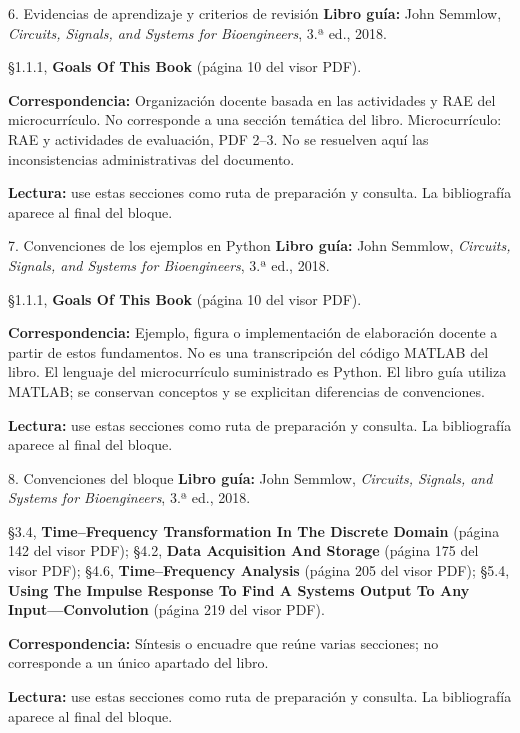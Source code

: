 \documentclass[
  10pt,
  ignorenonframetext,
  aspectratio=169,
  spanish,
]{beamer}
\begin{document}
\begin{frame}{6. Evidencias de aprendizaje y criterios de revisión}
\label{evidencias-de-aprendizaje-y-criterios-de-revisiuxf3n-1}
\textbf{Libro guía:} John Semmlow, \emph{Circuits, Signals, and Systems
for Bioengineers}, 3.ª ed., 2018.

§1.1.1, \textbf{Goals Of This Book} (página 10 del visor PDF).

\textbf{Correspondencia:} Organización docente basada en las actividades
y RAE del microcurrículo. No corresponde a una sección temática del
libro. Microcurrículo: RAE y actividades de evaluación, PDF 2--3. No se
resuelven aquí las inconsistencias administrativas del documento.

\textbf{Lectura:} use estas secciones como ruta de preparación y
consulta. La bibliografía aparece al final del bloque.
\end{frame}

\begin{frame}{7. Convenciones de los ejemplos en Python}
\label{convenciones-de-los-ejemplos-en-python-1}
\textbf{Libro guía:} John Semmlow, \emph{Circuits, Signals, and Systems
for Bioengineers}, 3.ª ed., 2018.

§1.1.1, \textbf{Goals Of This Book} (página 10 del visor PDF).

\textbf{Correspondencia:} Ejemplo, figura o implementación de
elaboración docente a partir de estos fundamentos. No es una
transcripción del código MATLAB del libro. El lenguaje del
microcurrículo suministrado es Python. El libro guía utiliza MATLAB; se
conservan conceptos y se explicitan diferencias de convenciones.

\textbf{Lectura:} use estas secciones como ruta de preparación y
consulta. La bibliografía aparece al final del bloque.
\end{frame}

\begin{frame}{8. Convenciones del bloque}
\label{convenciones-del-bloque}
\textbf{Libro guía:} John Semmlow, \emph{Circuits, Signals, and Systems
for Bioengineers}, 3.ª ed., 2018.

§3.4, \textbf{Time--Frequency Transformation In The Discrete Domain}
(página 142 del visor PDF); §4.2, \textbf{Data Acquisition And Storage}
(página 175 del visor PDF); §4.6, \textbf{Time--Frequency Analysis}
(página 205 del visor PDF); §5.4, \textbf{Using The Impulse Response To
Find A Systems Output To Any Input---Convolution} (página 219 del visor
PDF).

\textbf{Correspondencia:} Síntesis o encuadre que reúne varias
secciones; no corresponde a un único apartado del libro.

\textbf{Lectura:} use estas secciones como ruta de preparación y
consulta. La bibliografía aparece al final del bloque.
\end{frame}
\end{document}

